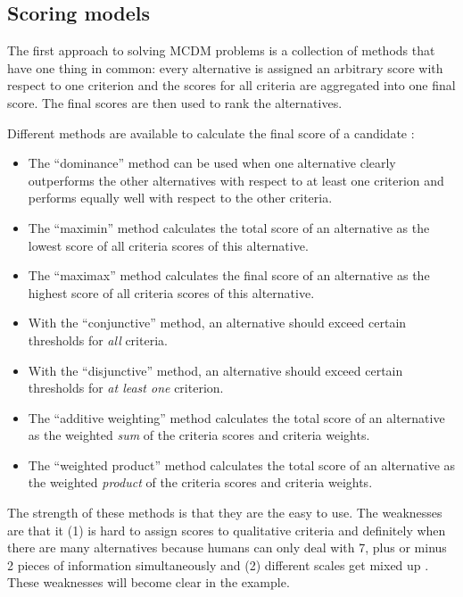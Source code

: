 \subsection{Scoring models}

The first approach to solving MCDM problems is a collection of methods that have one thing in common: every alternative is assigned an arbitrary score with respect to one criterion and the scores for all criteria are aggregated into one final score. The final scores are then used to rank the alternatives.

Different methods are available to calculate the final score of a candidate \cite{Kahraman:2008}:

\begin{itemize}
    \item The ``dominance'' method can be used when one alternative  clearly outperforms the other alternatives with respect to at least one criterion and performs equally well with respect to the other criteria. 
    \item The ``maximin'' method calculates the total score of an alternative as the lowest score of all criteria scores of this alternative.
    \item The ``maximax'' method calculates the final score of an alternative as the highest score of all criteria scores of this alternative.
    \item With the ``conjunctive'' method, an alternative should exceed certain thresholds for \emph{all} criteria.
    \item With the ``disjunctive'' method, an alternative should exceed certain thresholds for \emph{at least one} criterion. 
    \item The ``additive weighting'' method calculates the total score of an alternative as the weighted \emph{sum} of the criteria scores and criteria weights.
    \item The ``weighted product'' method calculates the total score of an alternative as the weighted \emph{product} of the criteria scores and criteria weights.
\end{itemize}

The strength of these methods is that they are the easy to use. The weaknesses are that it (1) is hard to assign scores to qualitative criteria and definitely when there are many alternatives because humans can only deal with 7, plus or minus 2 pieces of information simultaneously and (2) different scales get mixed up \cite{Jadhav:2009, Miller:1956}. These weaknesses will become clear in the example.

